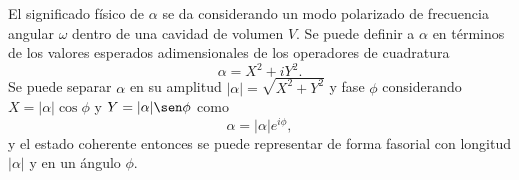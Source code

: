 El significado físico de $\alpha$ se da considerando un modo polarizado de frecuencia angular $\omega$ dentro de una cavidad de volumen $V$. Se puede definir a $\alpha$ en términos de los valores esperados adimensionales de los operadores de cuadratura
\begin{equation*}
  \alpha = X^2 + iY^2.
\end{equation*}
Se puede separar $\alpha$ en su amplitud $|\alpha|=\sqrt{X^2 + Y^2}$ y fase $\phi$ considerando $X = |\alpha|\cos\phi$ y $Y=|\alpha|\sen\phi$ como
\begin{equation*}
  \alpha = |\alpha|e^{i\phi},
\end{equation*}
y el estado coherente entonces se puede representar de forma fasorial con longitud $|\alpha|$ y en un ángulo $\phi$.
\begin{figure}[!h]
  \centering

  \begin{tikzpicture}[x=0.75pt,y=0.75pt,yscale=-1,xscale=1]


\end{tikzpicture}
\end{figure}
